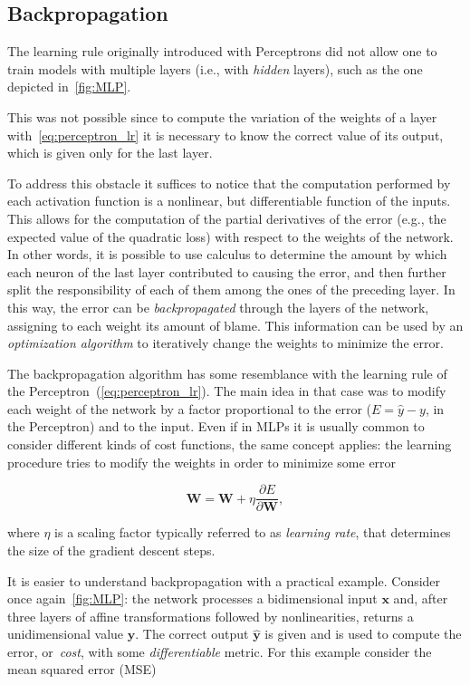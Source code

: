 \subsection{Backpropagation}\label{sec:backprop}
The learning rule originally introduced with Perceptrons did not allow one to
train models with multiple layers (i.e., with \emph{hidden} layers), such as
the one depicted in~\autoref{fig:MLP}.

This was not possible since to compute the variation of the weights of a layer
with~\autoref{eq:perceptron_lr} it is necessary to know the correct value of
its output, which is given only for the last layer.

To address this obstacle it suffices to notice that the computation performed
by each activation function is a nonlinear, but differentiable function of the
inputs. This allows for the computation of the partial derivatives of the error
(e.g., the expected value of the quadratic loss) with respect to the weights of
the network. In other words, it is possible to use calculus to determine the
amount by which each neuron of the last layer contributed to causing the error,
and then further split the responsibility of each of them among the ones of the
preceding layer. In this way, the error can be \emph{backpropagated} through
the layers of the network, assigning to each weight its amount of blame. This
information can be used by an \emph{optimization algorithm} to iteratively
change the weights to minimize the error.

The backpropagation algorithm has some resemblance with the learning rule of
the Perceptron~(\autoref{eq:perceptron_lr}). The main idea in that case was
to modify each weight of the network by a factor proportional to the error
($E = \hat y - y$, in the Perceptron) and to the input. Even if in MLPs it is
usually common to consider different kinds of cost functions, the same concept
applies: the learning procedure tries to modify the weights in order to
minimize some error

\begin{equation}
    \mathbf{W} = \mathbf{W} + \eta \frac{\partial E}{\partial \mathbf{W}},
\end{equation}

\noindent where $\eta$ is a scaling factor typically referred to as
\emph{learning rate}, that determines the size of the gradient descent steps.

It is easier to understand backpropagation with a practical example. Consider
once again~\autoref{fig:MLP}: the network processes a bidimensional input
$\mathbf{x}$ and, after three layers of affine transformations followed by
nonlinearities, returns a unidimensional value $\mathbf{y}$. The correct output
$\mathbf{\hat y}$ is given and is used to compute the error, or~\emph{cost},
with some \emph{differentiable} metric. For this example consider the
mean squared error (MSE)

